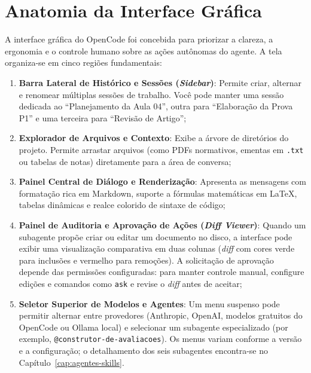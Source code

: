 \section{Anatomia da Interface Gr{\'a}fica}

A interface gr{\'a}fica do OpenCode foi concebida para priorizar a clareza, a ergonomia e o controle humano sobre as a{\c c}{\~o}es aut{\^o}nomas do agente. A tela organiza-se em cinco regi{\~o}es fundamentais:

\begin{enumerate}
  \item \textbf{Barra Lateral de Hist{\'o}rico e Sess{\~o}es (\emph{Sidebar})}: Permite criar, alternar e renomear m{\'u}ltiplas sess{\~o}es de trabalho. Voc{\^e} pode manter uma sess{\~a}o dedicada ao ``Planejamento da Aula 04'', outra para ``Elabora{\c c}{\~a}o da Prova P1'' e uma terceira para ``Revis{\~a}o de Artigo'';
  \item \textbf{Explorador de Arquivos e Contexto}: Exibe a {\'a}rvore de diret{\'o}rios do projeto. Permite arrastar arquivos (como PDFs normativos, ementas em \texttt{.txt} ou tabelas de notas) diretamente para a {\'a}rea de conversa;
  \item \textbf{Painel Central de Di{\'a}logo e Renderiza{\c c}{\~a}o}: Apresenta as mensagens com formata{\c c}{\~a}o rica em Markdown, suporte a f{\'o}rmulas matem{\'a}ticas em \LaTeX, tabelas din{\^a}micas e realce colorido de sintaxe de c{\'o}digo;
  \item \textbf{Painel de Auditoria e Aprova{\c c}{\~a}o de A{\c c}{\~o}es (\emph{Diff Viewer})}: Quando um subagente prop{\~o}e criar ou editar um documento no disco, a interface pode exibir uma visualiza{\c c}{\~a}o comparativa em duas colunas (\emph{diff} com cores verde para inclus{\~o}es e vermelho para remo{\c c}{\~o}es). A solicita{\c c}{\~a}o de aprova{\c c}{\~a}o depende das permiss{\~o}es configuradas: para manter controle manual, configure edi{\c c}{\~o}es e comandos como \texttt{ask} e revise o \emph{diff} antes de aceitar;
  \item \textbf{Seletor Superior de Modelos e Agentes}: Um menu suspenso pode permitir alternar entre provedores (Anthropic, OpenAI, modelos gratuitos do OpenCode ou Ollama local) e selecionar um subagente especializado (por exemplo, \texttt{@construtor-de-avaliacoes}). Os menus variam conforme a vers{\~a}o e a configura{\c c}{\~a}o; o detalhamento dos seis subagentes encontra-se no Cap{\'i}tulo~\ref{cap:agentes-skills}.
\end{enumerate}

